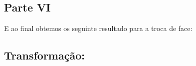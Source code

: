 \documentclass[journal]{IEEEtran}
\begin{document}
\begin{figure}[h]
\centering
{}
\end{figure}



\subsection*{Parte VI}

E ao final obtemos os seguinte resultado para a troca de face:

\begin{figure}[h]
\centering
{}
\end{figure}



\subsection*{Transformação:}
\end{document}

